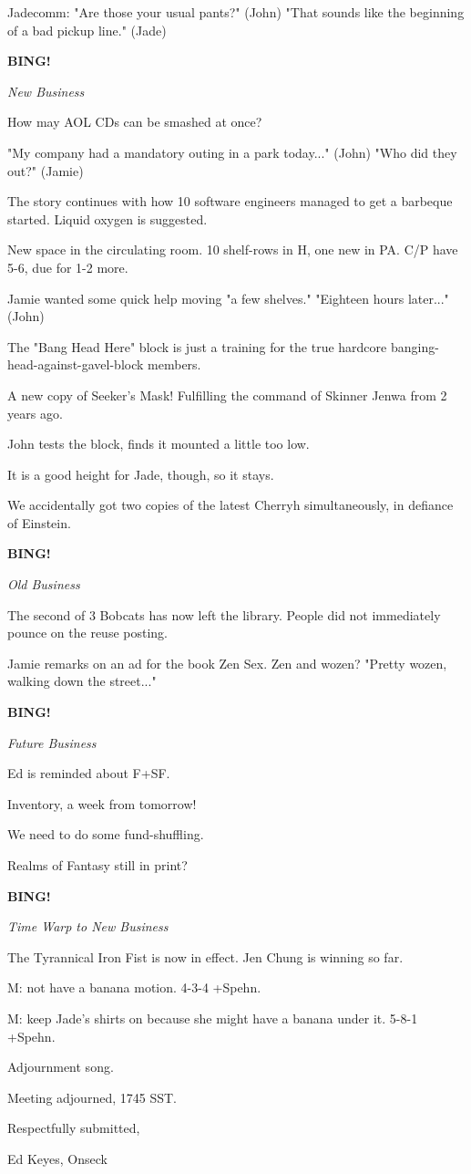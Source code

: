 \documentclass[12pt]{article}
\newcommand{\bing}{{\bf BING!} }
\newcommand{\goto}[1]{\bing \vskip 12pt \centerline{{\em{#1}}}}
\begin{document}
Jadecomm: "Are those your usual pants?" (John) "That sounds like the beginning of a bad pickup line." (Jade)

\goto{New Business}

How may AOL CDs can be smashed at once?

"My company had a mandatory outing in a park today..." (John) "Who did they out?" (Jamie)

The story continues with how 10 software engineers managed to get a barbeque started. Liquid oxygen is suggested.

New space in the circulating room. 10 shelf-rows in H, one new in PA. C/P have 5-6, due for 1-2 more.

Jamie wanted some quick help moving "a few shelves." "Eighteen hours later..." (John)

The "Bang Head Here" block is just a training for the true hardcore banging-head-against-gavel-block members.

A new copy of Seeker's Mask! Fulfilling the command of Skinner Jenwa from 2 years ago.

John tests the block, finds it mounted a little too low.

It is a good height for Jade, though, so it stays.

We accidentally got two copies of the latest Cherryh simultaneously, in defiance of Einstein. 

\goto{Old Business}

The second of 3 Bobcats has now left the library. People did not immediately pounce on the reuse posting.

Jamie remarks on an ad for the book Zen Sex. Zen and wozen? "Pretty wozen, walking down the street..."

\goto{Future Business}

Ed is reminded about F+SF.

Inventory, a week from tomorrow!

We need to do some fund-shuffling.

Realms of Fantasy still in print?

\goto{Time Warp to New Business}

The Tyrannical Iron Fist is now in effect. Jen Chung is winning so far.

M: not have a banana motion. 4-3-4 +Spehn.

M: keep Jade's shirts on because she might have a banana under it. 5-8-1 +Spehn.

Adjournment song.

\vspace{12pt}

\noindent
Meeting adjourned, 1745 SST.

\vspace{18pt}

\centerline{Respectfully submitted,}
\centerline{Ed Keyes, Onseck}
\end{document}
